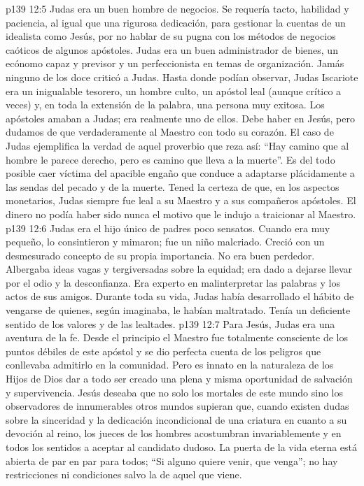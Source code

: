 \vs p139 12:5 \pc Judas era un buen hombre de negocios. Se requería tacto, habilidad y paciencia, al igual que una rigurosa dedicación, para gestionar la cuentas de un idealista como Jesús, por no hablar de su pugna con los métodos de negocios caóticos de algunos apóstoles. Judas era un buen administrador de bienes, un ecónomo capaz y previsor y un perfeccionista en temas de organización. Jamás ninguno de los doce criticó a Judas. Hasta donde podían observar, Judas Iscariote era un inigualable tesorero, un hombre culto, un apóstol leal (aunque crítico a veces) y, en toda la extensión de la palabra, una persona muy exitosa. Los apóstoles amaban a Judas; era realmente uno de ellos. Debe haber  en Jesús, pero dudamos de que  verdaderamente al Maestro con todo su corazón. El caso de Judas ejemplifica la verdad de aquel proverbio que reza así: “Hay camino que al hombre le parece derecho, pero es camino que lleva a la muerte”. Es del todo posible caer víctima del apacible engaño que conduce a adaptarse plácidamente a las sendas del pecado y de la muerte. Tened la certeza de que, en los aspectos monetarios, Judas siempre fue leal a su Maestro y a sus compañeros apóstoles. El dinero no podía haber sido nunca el motivo que le indujo a traicionar al Maestro.
\vs p139 12:6 Judas era el hijo único de padres poco sensatos. Cuando era muy pequeño, lo consintieron y mimaron; fue un niño malcriado. Creció con un desmesurado concepto de su propia importancia. No era buen perdedor. Albergaba ideas vagas y tergiversadas sobre la equidad; era dado a dejarse llevar por el odio y la desconfianza. Era experto en malinterpretar las palabras y los actos de sus amigos. Durante toda su vida, Judas había desarrollado el hábito de vengarse de quienes, según imaginaba, le habían maltratado. Tenía un deficiente sentido de los valores y de las lealtades.
\vs p139 12:7 \pc Para Jesús, Judas era una aventura de la fe. Desde el principio el Maestro fue totalmente consciente de los puntos débiles de este apóstol y se dio perfecta cuenta de los peligros que conllevaba admitirlo en la comunidad. Pero es innato en la naturaleza de los Hijos de Dios dar a todo ser creado una plena y misma oportunidad de salvación y supervivencia. Jesús deseaba que no solo los mortales de este mundo sino los observadores de innumerables otros mundos supieran que, cuando existen dudas sobre la sinceridad y la dedicación incondicional de una criatura en cuanto a su devoción al reino, los jueces de los hombres acostumbran invariablemente y en todos los sentidos a aceptar al candidato dudoso. La puerta de la vida eterna está abierta de par en par para todos; “Si alguno quiere venir, que venga”; no hay restricciones ni condiciones salvo la  de aquel que viene.
